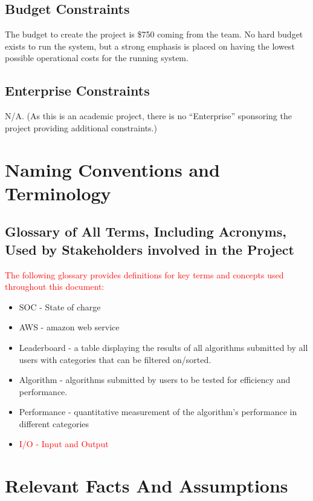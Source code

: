 \documentclass[12pt]{article}
\begin{document}
\subsection{Budget Constraints}
The budget to create the project is \$750 coming from the team. No hard budget exists to run the system, but a strong emphasis is placed on having the lowest possible operational costs for the running system.
\subsection{Enterprise Constraints}
N/A. (As this is an academic project, there is no “Enterprise” sponsoring the project providing additional constraints.)

\section{Naming Conventions and Terminology}
\subsection{Glossary of All Terms, Including Acronyms, Used by Stakeholders
involved in the Project}
\textcolor{red}{The following glossary provides definitions for key terms and concepts used throughout this document:}
\begin{itemize}
\item SOC - State of charge
\item AWS - amazon web service
\item Leaderboard - a table displaying the results of all algorithms submitted by all users with categories that can be filtered on/sorted. 
\item Algorithm - algorithms submitted by users to be tested for efficiency and performance.
\item Performance - quantitative measurement of the algorithm’s performance in different categories
\item \textcolor{red}{I/O - Input and Output}

\end{itemize}



\section{Relevant Facts And Assumptions}
\end{document}

